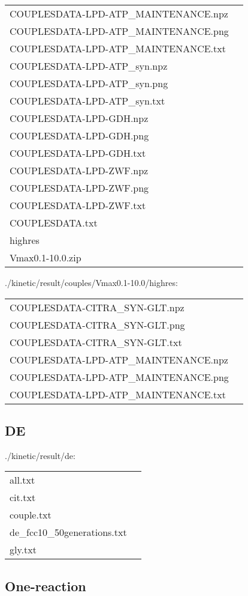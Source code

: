 \documentclass[a4paper, parskip=full]{scrreprt}
\begin{document}
\begin{longtable}{ll}
COUPLESDATA-LPD-ATP\_MAINTENANCE.npz\\
COUPLESDATA-LPD-ATP\_MAINTENANCE.png\\
COUPLESDATA-LPD-ATP\_MAINTENANCE.txt\\
COUPLESDATA-LPD-ATP\_syn.npz\\
COUPLESDATA-LPD-ATP\_syn.png\\
COUPLESDATA-LPD-ATP\_syn.txt\\
COUPLESDATA-LPD-GDH.npz\\
COUPLESDATA-LPD-GDH.png\\
COUPLESDATA-LPD-GDH.txt\\
COUPLESDATA-LPD-ZWF.npz\\
COUPLESDATA-LPD-ZWF.png\\
COUPLESDATA-LPD-ZWF.txt\\
COUPLESDATA.txt\\
highres\\
Vmax0.1-10.0.zip
\end{longtable}

./kinetic/result/couples/Vmax0.1-10.0/highres:

\begin{longtable}{ll}
COUPLESDATA-CITRA\_SYN-GLT.npz\\
COUPLESDATA-CITRA\_SYN-GLT.png\\
COUPLESDATA-CITRA\_SYN-GLT.txt\\
COUPLESDATA-LPD-ATP\_MAINTENANCE.npz\\
COUPLESDATA-LPD-ATP\_MAINTENANCE.png\\
COUPLESDATA-LPD-ATP\_MAINTENANCE.txt
\end{longtable}

\subsection{DE}
\label{ssec:de}

./kinetic/result/de:

\begin{longtable}{ll}
all.txt\\
cit.txt\\
couple.txt\\
de\_fcc10\_50generations.txt\\
gly.txt
\end{longtable}

\subsection{One-reaction}
\label{ssec:onereaction}
\end{document}
